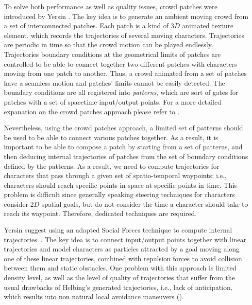 To solve both performance as well as quality issues, crowd patches were introduced by Yersin \etal \cite{Yersin:2009}.
The key idea is to generate an ambient moving crowd from a set of interconnected patches.
Each patch is a kind of $3D$ animated texture element, which records the trajectories of several moving characters.
Trajectories are periodic in time so that the crowd motion can be played endlessly.
Trajectories boundary conditions at the geometrical limits of patches are controlled to be able to connect together two different patches with characters moving from one patch to another.
Thus, a crowd animated from a set of patches have a seamless motion and patches' limits cannot be easily detected.
The boundary conditions are all registered into {\it patterns}, which are sort of gates for patches with a set of spacetime input/output points.
For a more detailed expanation on the crowd patches approach please refer to \cite{Yersin:2009}. 

Nevertheless, using the crowd patches approach, a limited set of patterns should be used to be able to connect various patches together. As a result, it is important to be able to compose a patch by starting from a set of patterns, and then deducing internal trajectories of patches from the set of boundary conditions defined by the patterns.
As a result, we need to compute trajectories for characters that pass through a given set of spatio-temporal waypoints; i.e., characters should reach specific points in space at specific points in time.
This problem is difficult since generally speaking steering techniques for characters consider $2D$ spatial goals, but do not consider the time a character should take to reach its waypoint.
Therefore, dedicated techniques are required. 

Yersin \etal suggest using an adapted Social Forces technique to compute internal trajectories~\cite{Helbing:2005}.
The key idea is to connect input/output points together with linear trajectories and model characters as particles attracted by a goal moving along one of these linear trajectories, combined with repulsion forces to avoid collision between them and static obstacles.
One problem with this approach is limited density level, as well as the level of quality of trajectories that suffer from the usual drawbacks of Helbing's generated trajectories, i.e., lack of anticipation, which results into non natural local avoidance maneuvers (). 

